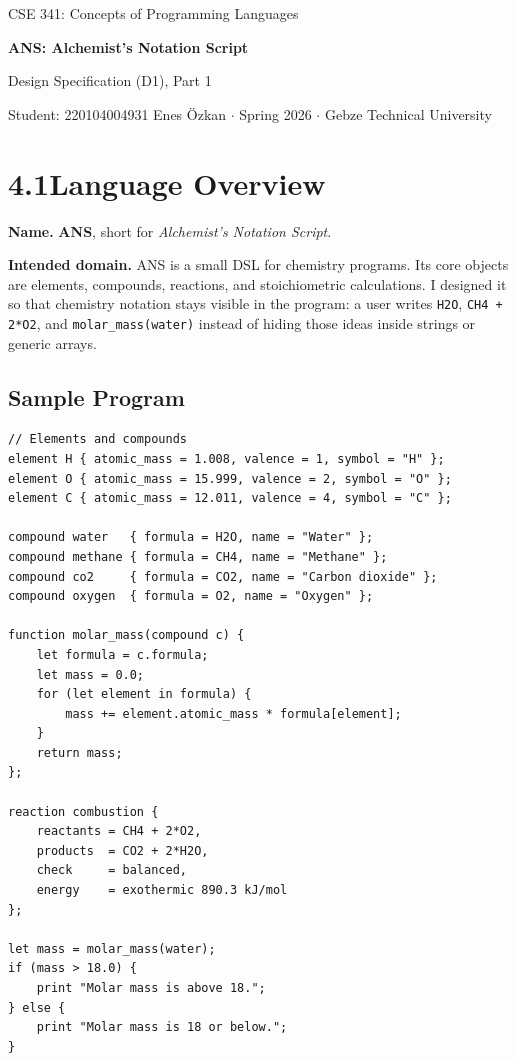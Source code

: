 \documentclass[11pt,a4paper]{article}
\newcommand{\code}[1]{\texttt{#1}}
\begin{document}
\begin{center}
  {\footnotesize\color{anscaption}CSE 341: Concepts of Programming Languages\par}
  \vspace{3pt}
  {\huge\bfseries\sffamily ANS: Alchemist's Notation Script\par}
  \vspace{4pt}
  {\large Design Specification (D1), Part 1\par}
  \vspace{6pt}
  {\footnotesize\color{anscaption}
    Student: 220104004931 Enes Özkan \(\cdot\)
    Spring 2026 \(\cdot\)
    Gebze Technical University\par}
\end{center}
\vspace{7pt}

\section{4.1\quad Language Overview}

\textbf{Name.} \textbf{ANS}, short for \textit{Alchemist's Notation Script}.

\textbf{Intended domain.} ANS is a small DSL for chemistry programs. Its core objects are
elements, compounds, reactions, and stoichiometric calculations. I designed it so that chemistry
notation stays visible in the program: a user writes \code{H2O}, \code{CH4 + 2*O2}, and
\code{molar\_mass(water)} instead of hiding those ideas inside strings or generic arrays.

\subsection{Sample Program}
\begin{lstlisting}[style=ans]
// Elements and compounds
element H { atomic_mass = 1.008, valence = 1, symbol = "H" };
element O { atomic_mass = 15.999, valence = 2, symbol = "O" };
element C { atomic_mass = 12.011, valence = 4, symbol = "C" };

compound water   { formula = H2O, name = "Water" };
compound methane { formula = CH4, name = "Methane" };
compound co2     { formula = CO2, name = "Carbon dioxide" };
compound oxygen  { formula = O2, name = "Oxygen" };

function molar_mass(compound c) {
    let formula = c.formula;
    let mass = 0.0;
    for (let element in formula) {
        mass += element.atomic_mass * formula[element];
    }
    return mass;
};

reaction combustion {
    reactants = CH4 + 2*O2,
    products  = CO2 + 2*H2O,
    check     = balanced,
    energy    = exothermic 890.3 kJ/mol
};

let mass = molar_mass(water);
if (mass > 18.0) {
    print "Molar mass is above 18.";
} else {
    print "Molar mass is 18 or below.";
}
\end{lstlisting}
\end{document}
